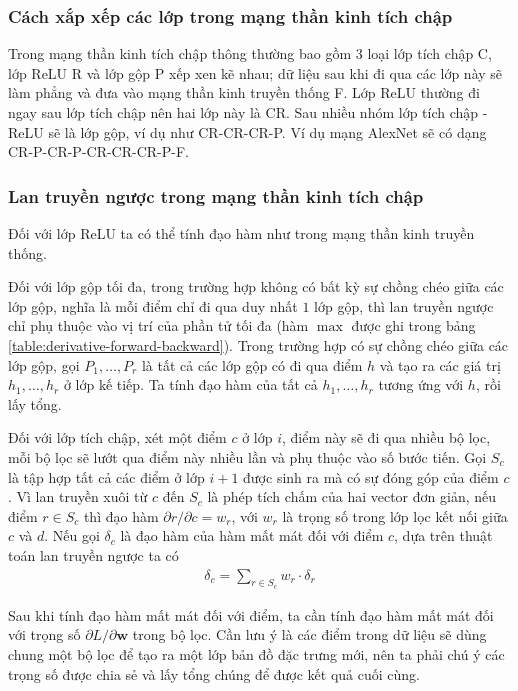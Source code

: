\subsubsection{Cách xắp xếp các lớp trong mạng thần kinh tích chập}
Trong mạng thần kinh tích chập thông thường bao gồm $3$ loại lớp tích chập C, lớp ReLU R và lớp gộp P xếp xen kẽ nhau; dữ liệu sau khi đi qua các lớp này sẽ làm phẳng và đưa vào mạng thần kinh truyền thống F. Lớp ReLU thường đi ngay sau lớp tích chập nên hai lớp này là CR. Sau nhiều nhóm lớp tích chập - ReLU sẽ là lớp gộp, ví dụ như CR-CR-CR-P. Ví dụ mạng AlexNet sẽ có dạng CR-P-CR-P-CR-CR-CR-P-F.

\subsubsection{Lan truyền ngược trong mạng thần kinh tích chập}
Đối với lớp ReLU ta có thể tính đạo hàm như trong mạng thần kinh truyền thống.

Đối với lớp gộp tối đa, trong trường hợp không có bất kỳ sự chồng chéo giữa các lớp gộp, nghĩa là mỗi điểm chỉ đi qua duy nhất $1$ lớp gộp, thì lan truyền ngược chỉ phụ thuộc vào vị trí của phần tử tối đa (hàm $\max$ được ghi trong bảng \ref{table:derivative-forward-backward}). Trong trường hợp có sự chồng chéo giữa các lớp gộp, gọi $P_1,\dots,P_r$ là tất cả các lớp gộp có đi qua điểm $h$ và tạo ra các giá trị $h_1,\dots,h_r$ ở lớp kế tiếp. Ta tính đạo hàm của tất cả $h_1,\dots,h_r$ tương ứng với $h$, rồi lấy tổng.

Đối với lớp tích chập, xét một điểm $c$ ở lớp $i$, điểm này sẽ đi qua nhiều bộ lọc, mỗi bộ lọc sẽ lướt qua điểm này nhiều lần và phụ thuộc vào số bước tiến. Gọi $S_c$ là tập hợp tất cả các điểm ở lớp $i+1$ được sinh ra mà có sự đóng góp của điểm $c$. Vì lan truyền xuôi từ $c$ đến $S_c$ là phép tích chấm của hai vector đơn giản, nếu điểm $r\in S_c$ thì đạo hàm $\partial r/\partial c=w_r$, với $w_r$ là trọng số trong lớp lọc kết nối giữa $c$ và $d$. Nếu gọi $\delta_c$ là đạo hàm của hàm mất mát đối với điểm $c$, dựa trên thuật toán lan truyền ngược ta có
\begin{align}
    \label{equation:cnn-backpropagation}
    \delta_c=\sum_{r\in S_c}w_r\cdot\delta_r
\end{align}

Sau khi tính đạo hàm mất mát đối với điểm, ta cần tính đạo hàm mất mát đối với trọng số $\partial L/\partial\mathbf w$ trong bộ lọc. Cần lưu ý là các điểm trong dữ liệu sẽ dùng chung một bộ lọc để tạo ra một lớp bản đồ đặc trưng mới, nên ta phải chú ý các trọng số được chia sẻ và lấy tổng chúng để được kết quả cuối cùng.

